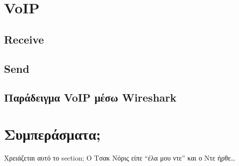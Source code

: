 \documentclass{article}
\begin{document}
\section{VoIP}
\subsection{Receive}
\subsection{Send}
\subsection{Παράδειγμα VoIP μέσω Wireshark}
\section{Συμπεράσματα;}
Χρειάζεται αυτό το section; Ο Τσακ Νόρις είπε ``έλα μου ντε'' και ο Ντε ήρθε\ldots
\end{document}
